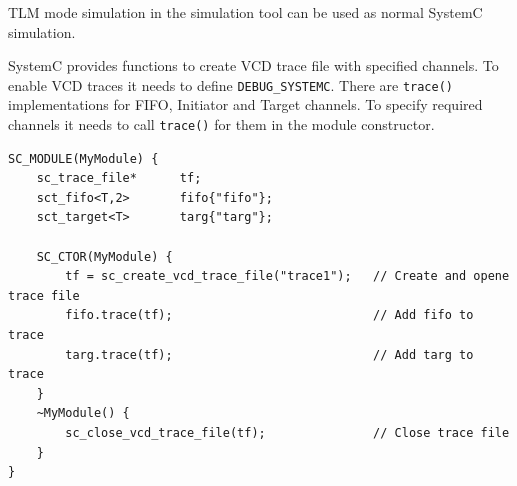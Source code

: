 TLM mode simulation in the simulation tool can be used as normal SystemC simulation.

SystemC provides functions to create VCD trace file with specified channels. To enable VCD traces it needs to define {\tt DEBUG\_SYSTEMC}. There are {\tt trace()} implementations for FIFO, Initiator and Target channels. To specify required channels it needs to call {\tt trace()} for them in the module constructor.

\begin{lstlisting}[style=mycpp]
SC_MODULE(MyModule) {
    sc_trace_file*      tf;
    sct_fifo<T,2>       fifo{"fifo"};
    sct_target<T>       targ{"targ"};
    
    SC_CTOR(MyModule) {
        tf = sc_create_vcd_trace_file("trace1");   // Create and opene trace file
        fifo.trace(tf);                            // Add fifo to trace
        targ.trace(tf);                            // Add targ to trace
    }
    ~MyModule() {
        sc_close_vcd_trace_file(tf);               // Close trace file
    }
}
\end{lstlisting}
